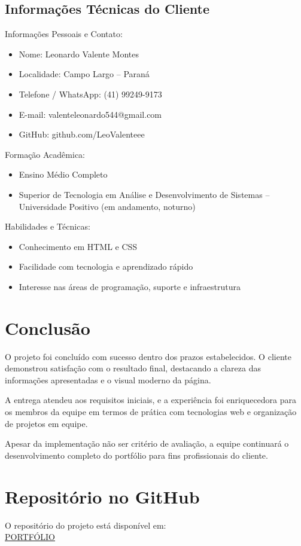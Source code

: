 \documentclass[12pt]{article}
\begin{document}
\subsection*{Informações Técnicas do Cliente}

Informações Pessoais e Contato:

\begin{itemize}
    \item Nome: Leonardo Valente Montes
    \item Localidade: Campo Largo – Paraná
    \item Telefone / WhatsApp: (41) 99249-9173
    \item E-mail: valenteleonardo544@gmail.com
    \item GitHub: github.com/LeoValenteee
\end{itemize}

Formação Acadêmica:

\begin{itemize}
    \item Ensino Médio Completo
    \item Superior de Tecnologia em Análise e Desenvolvimento de Sistemas – Universidade Positivo (em andamento, noturno)
\end{itemize}

Habilidades e Técnicas:

\begin{itemize}
    \item Conhecimento em HTML e CSS
    \item Facilidade com tecnologia e aprendizado rápido
    \item Interesse nas áreas de programação, suporte e infraestrutura
\end{itemize}

\section{Conclusão}

O projeto foi concluído com sucesso dentro dos prazos estabelecidos. O cliente demonstrou satisfação com o resultado final, destacando a clareza das informações apresentadas e o visual moderno da página.

A entrega atendeu aos requisitos iniciais, e a experiência foi enriquecedora para os membros da equipe em termos de prática com tecnologias web e organização de projetos em equipe.

Apesar da implementação não ser critério de avaliação, a equipe continuará o desenvolvimento completo do portfólio para fins profissionais do cliente.

\section{Repositório no GitHub}

O repositório do projeto está disponível em:\\\href{https://github.com/JuanJASP/repositoriofinalcliente.git}{PORTFÓLIO}
\end{document}
